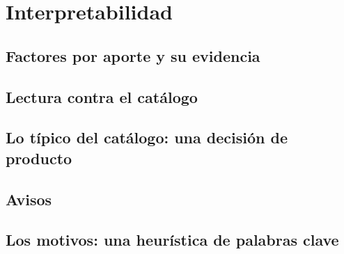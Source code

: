 \section{Interpretabilidad}\label{sec:interpretabilidad}

\subsection{Factores por aporte y su evidencia}\label{sec:interpretabilidad-factores}

\subsection{Lectura contra el catálogo}

\subsection{Lo típico del catálogo: una decisión de producto}

\subsection{Avisos}

\subsection{Los motivos: una heurística de palabras clave}\label{sec:interpretabilidad-motivos}
